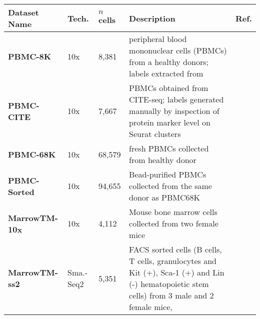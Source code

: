 \begin{table}
\begin{small}
\begin{tabularx}{\textwidth}{lllXl}
\toprule
\textbf{Dataset Name} & \textbf{Tech.} &\textbf{$n$ cells} &  \textbf{Description} & \textbf{Ref.} \\
\midrule




\textbf{PBMC-8K} & 10x & 8,381 & peripheral blood mononuclear cells (PBMCs) from a healthy donors; labels extracted from \cite{SCONE} & \cite{10x}\\[0.2cm]

\textbf{PBMC-CITE} &10x & 7,667 & PBMCs  obtained from CITE-seq; labels generated manually by inspection of protein marker level on Seurat clusters &\cite{stoeckius2017simultaneous}\\[0.2cm]

\textbf{PBMC-68K} & 10x & 68,579 & fresh PBMCs collected from healthy donor &\cite{zheng2017massively} \\[0.2cm]

\textbf{PBMC-Sorted} &10x &  94,655 & Bead-purified PBMCs collected from the same donor as PBMC68K  & \cite{zheng2017massively}\\[1cm]

\textbf{MarrowTM-10x} &10x &4,112 & Mouse bone marrow cells collected from two female mice & \cite{quake2018single}\\[0.2cm]

\textbf{MarrowTM-ss2} &  Sma.-Seq2 & 5,351 & FACS sorted cells (B cells, T cells, granulocytes and  Kit (+), Sca-1 (+) and Lin (-) hematopoietic stem cells) from 3 male and 2 female mice, & \cite{quake2018single}\\[1cm]


\end{tabularx}
\end{small}
\end{table}
